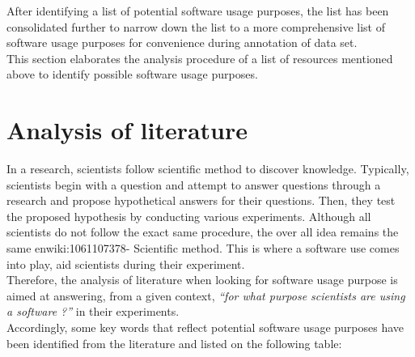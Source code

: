 After identifying a list of potential software usage purposes, the list has been consolidated further to narrow down the list to a more comprehensive list of software usage purposes for convenience during annotation of data set. \\

This section elaborates the analysis procedure of a list of resources mentioned above to identify possible software usage purposes.  
 

\section{Analysis of literature }
\label{sec:purpose:literatures}

In a research, scientists follow scientific method to discover knowledge. Typically, scientists begin with a question and attempt to answer questions through a research and propose hypothetical answers for their questions. Then, they test the proposed hypothesis by conducting various experiments. Although all scientists do not follow the exact same procedure, the over all idea remains the same {enwiki:1061107378- Scientific method}. This is where a software use comes into play, aid scientists during their experiment. \\

Therefore, the analysis of literature when looking for software usage purpose is aimed at answering, from a given context, \emph{“for what purpose scientists are using a software ?”} in their experiments.\\

Accordingly, some key words that reflect potential software usage purposes have been identified from the literature and listed on the following table:




